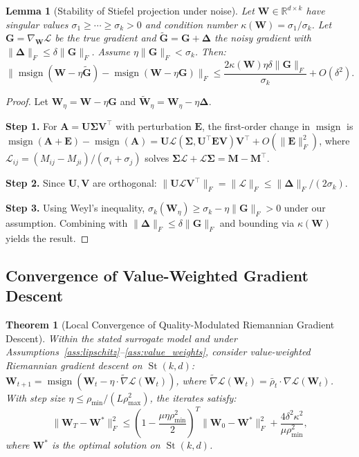 \documentclass[twocolumn]{article}
\newtheorem{theorem}{Theorem}
\newtheorem{lemma}{Lemma}
\DeclareMathOperator{\msign}{msign}
\DeclareMathOperator{\St}{St}
\begin{document}
\begin{lemma}[Stability of Stiefel projection under noise]\label{lem:stability-full}
Let $\mathbf{W} \in \mathbb{R}^{d \times k}$ have singular values $\sigma_1 \geq \cdots \geq \sigma_k > 0$ and condition number $\kappa(\mathbf{W}) = \sigma_1/\sigma_k$. Let $\mathbf{G} = \nabla_{\mathbf{W}} \mathcal{L}$ be the true gradient and $\tilde{\mathbf{G}} = \mathbf{G} + \boldsymbol{\Delta}$ the noisy gradient with $\|\boldsymbol{\Delta}\|_F \leq \delta \|\mathbf{G}\|_F$. Assume $\eta \|\mathbf{G}\|_F < \sigma_k$. Then:
\[
\|\msign(\mathbf{W} - \eta \tilde{\mathbf{G}}) - \msign(\mathbf{W} - \eta \mathbf{G})\|_F \leq \frac{2\kappa(\mathbf{W}) \eta \delta \|\mathbf{G}\|_F}{\sigma_k} + O(\delta^2).
\]
\end{lemma}

\begin{proof}
Let $\mathbf{W}_\eta = \mathbf{W} - \eta \mathbf{G}$ and $\tilde{\mathbf{W}}_\eta = \mathbf{W}_\eta - \eta \boldsymbol{\Delta}$.

\textbf{Step 1.}
For $\mathbf{A} = \mathbf{U}\boldsymbol{\Sigma}\mathbf{V}^\top$ with perturbation $\mathbf{E}$, the first-order change in $\msign$ is $\msign(\mathbf{A} + \mathbf{E}) - \msign(\mathbf{A}) = \mathbf{U} \mathcal{L}(\boldsymbol{\Sigma}, \mathbf{U}^\top \mathbf{E} \mathbf{V}) \mathbf{V}^\top + O(\|\mathbf{E}\|_F^2)$,
where $\mathcal{L}_{ij} = (M_{ij} - M_{ji})/(\sigma_i + \sigma_j)$ solves $\boldsymbol{\Sigma} \mathcal{L} + \mathcal{L} \boldsymbol{\Sigma} = \mathbf{M} - \mathbf{M}^\top$.

\textbf{Step 2.}
Since $\mathbf{U}, \mathbf{V}$ are orthogonal: $\|\mathbf{U} \mathcal{L} \mathbf{V}^\top\|_F = \|\mathcal{L}\|_F \leq \|\boldsymbol{\Delta}\|_F / (2\sigma_k)$.

\textbf{Step 3.}
Using Weyl's inequality, $\sigma_k(\mathbf{W}_\eta) \geq \sigma_k - \eta \|\mathbf{G}\|_F > 0$ under our assumption. Combining with $\|\boldsymbol{\Delta}\|_F \leq \delta \|\mathbf{G}\|_F$ and bounding via $\kappa(\mathbf{W})$ yields the result.
\end{proof}

\subsection{Convergence of Value-Weighted Gradient Descent}

\begin{theorem}[Local Convergence of Quality-Modulated Riemannian Gradient Descent]\label{thm:convergence}
Within the stated surrogate model and under Assumptions~\ref{ass:lipschitz}--\ref{ass:value_weights}, consider value-weighted Riemannian gradient descent on $\St(k,d)$:
$\mathbf{W}_{t+1} = \msign(\mathbf{W}_t - \eta \cdot \widetilde{\nabla} \mathcal{L}(\mathbf{W}_t))$,
where $\widetilde{\nabla} \mathcal{L}(\mathbf{W}_t) = \bar{\rho}_t \cdot \nabla \mathcal{L}(\mathbf{W}_t)$. With step size $\eta \leq \rho_{\min}/(L \rho_{\max}^2)$, the iterates satisfy:
\[
\|\mathbf{W}_T - \mathbf{W}^*\|_F^2 \leq \left(1 - \frac{\mu \eta \rho_{\min}^2}{2}\right)^T \|\mathbf{W}_0 - \mathbf{W}^*\|_F^2 + \frac{4\delta^2 \kappa^2}{\mu \rho_{\min}^2},
\]
where $\mathbf{W}^*$ is the optimal solution on $\St(k,d)$.
\end{theorem}
\end{document}
